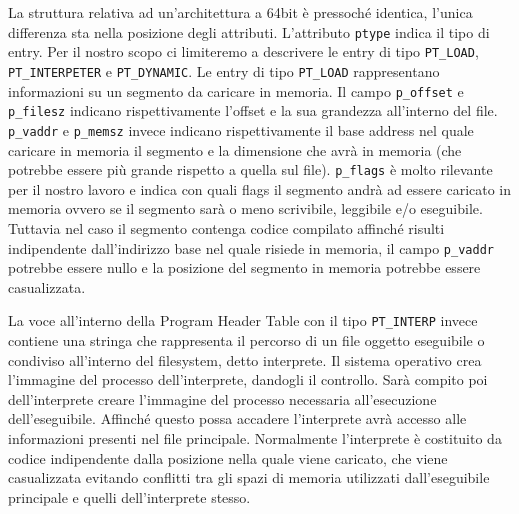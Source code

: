 La struttura relativa ad un'architettura a 64bit è pressoché identica,
l'unica differenza sta nella posizione degli attributi.  L'attributo
\lstinline{ptype} indica il tipo di entry. Per il nostro scopo ci
limiteremo a descrivere le entry di tipo \lstinline{PT_LOAD},
\lstinline{PT_INTERPETER} e \lstinline{PT_DYNAMIC}. Le entry di tipo
\lstinline{PT_LOAD} rappresentano informazioni su un segmento da
caricare in memoria. Il campo \lstinline{p_offset} e
\lstinline{p_filesz} indicano rispettivamente l'offset e la sua
grandezza all'interno del file. \lstinline{p_vaddr} e
\lstinline{p_memsz} invece indicano rispettivamente il base address
nel quale caricare in memoria il segmento e la dimensione che avrà in
memoria (che potrebbe essere più grande rispetto a quella sul
file). \lstinline{p_flags} è molto rilevante per il nostro lavoro e
indica con quali flags il segmento andrà ad essere caricato in memoria
ovvero se il segmento sarà o meno scrivibile, leggibile e/o
eseguibile. Tuttavia nel caso il segmento contenga codice compilato
affinché risulti indipendente dall'indirizzo base nel quale risiede in
memoria, il campo \lstinline{p_vaddr} potrebbe essere nullo e la
posizione del segmento in memoria potrebbe essere casualizzata.

La voce all'interno della Program Header Table con il tipo
\lstinline{PT_INTERP} invece contiene una stringa che rappresenta il
percorso di un file oggetto eseguibile o condiviso all'interno del
filesystem, detto interprete. Il sistema operativo crea l'immagine del
processo dell'interprete, dandogli il controllo. Sarà compito poi
dell'interprete creare l'immagine del processo necessaria
all'esecuzione dell'eseguibile. Affinché questo possa accadere
l'interprete avrà accesso alle informazioni presenti nel file
principale. Normalmente l'interprete è costituito da codice
indipendente dalla posizione nella quale viene caricato, che viene
casualizzata evitando conflitti tra gli spazi di memoria utilizzati
dall'eseguibile principale e quelli dell'interprete stesso.

